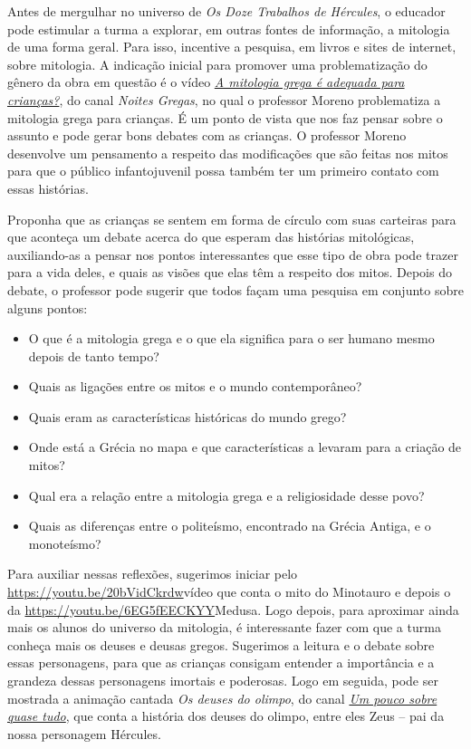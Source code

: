 \documentclass[11pt]{extarticle}
\begin{document}
Antes de mergulhar no universo de \textit{Os Doze Trabalhos de Hércules}, o educador pode estimular a turma a explorar, em outras fontes de informação, a mitologia de uma forma geral. Para isso, incentive a pesquisa, em livros e sites de internet, sobre mitologia. A indicação inicial para promover uma problematização do gênero da obra em questão é o vídeo \href{https://youtu.be/9qlhKoUj_dw}{\textit{A mitologia grega é adequada para crianças?}}, do canal \textit{Noites Gregas}, no qual o professor Moreno problematiza a mitologia grega para crianças. É um ponto de vista que nos faz pensar sobre o assunto e pode gerar bons debates com as crianças. O professor Moreno desenvolve um pensamento a respeito das modificações que são feitas nos mitos para que o público infantojuvenil possa também ter um primeiro contato com essas histórias. 

Proponha que as crianças se sentem em forma de círculo com suas carteiras para que aconteça um debate acerca do que esperam das histórias mitológicas, auxiliando-as a pensar nos pontos interessantes que esse tipo de obra pode trazer para a vida deles, e quais as visões que elas têm a respeito dos mitos. Depois do debate, o professor pode sugerir que todos façam uma pesquisa em conjunto sobre alguns pontos:

\begin{itemize}
\item O que é a mitologia grega e o que ela significa para o ser humano mesmo depois de tanto tempo?
\item Quais as ligações entre os mitos e o mundo contemporâneo?
\item Quais eram as características históricas do mundo grego?
\item Onde está a Grécia no mapa e que características a levaram para a criação de mitos?
\item Qual era a relação entre a mitologia grega e a religiosidade desse povo?
\item Quais as diferenças entre o politeísmo, encontrado na Grécia Antiga, e o monoteísmo? %
\end{itemize}



Para auxiliar nessas reflexões, sugerimos iniciar pelo \url{https://youtu.be/20bVidCkrdw}{vídeo que conta o mito do Minotauro} e depois o da \url{https://youtu.be/6EG5fEECKYY}{Medusa}. Logo depois, para aproximar ainda mais os alunos do universo da mitologia, é interessante fazer com que a turma conheça mais os deuses e deusas gregos. Sugerimos a leitura e o debate sobre essas personagens, para que as crianças consigam entender a importância e a grandeza dessas personagens imortais e poderosas. Logo em seguida, pode ser mostrada a animação cantada \textit{Os deuses do olimpo}, do canal \href{https://youtu.be/DJ-5cxJVI64}{\textit{Um pouco sobre quase tudo}}, que conta a história dos deuses do olimpo, entre eles Zeus -- pai da nossa personagem Hércules. 
\end{document}
